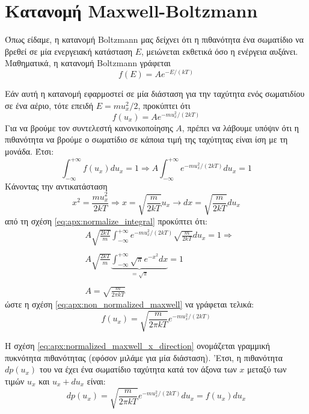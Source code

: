 \section{Κατανομή Maxwell-Boltzmann}
Όπως είδαμε, η κατανομή Boltzmann μας δείχνει ότι η πιθανότητα ένα σωματίδιο να βρεθεί σε μία ενεργειακή κατάσταση $E$, μειώνεται εκθετικά όσο η ενέργεια αυξάνει. Μαθηματικά, η κατανομή Boltzmann γράφεται
\begin{equation}
    f(E) = A e^{-E/(kT)}
\end{equation}

Εάν αυτή η κατανομή εφαρμοστεί σε μία διάσταση για την ταχύτητα ενός σωματιδίου σε ένα αέριο, τότε επειδή $E = mu_x^2/2$, προκύπτει ότι
\begin{equation}
    \label{eq:apx:non_normalized_maxwell}
    f(u_x) = A e^{-mu_x^2/(2kT)}
\end{equation}
Για να βρούμε τον συντελεστή κανονικοποίησης $A$, πρέπει να λάβουμε υπόψιν ότι η πιθανότητα να βρούμε ο σωματίδιο σε κάποια τιμή της ταχύτητας είναι ίση με τη μονάδα. Έτσι:
\begin{equation}
    \label{eq:apx:normalize_integral}
    \int_{- \infty}^{+ \infty} f(u_x) du_x = 1 \Rightarrow A \int_{- \infty}^{+ \infty} e^{-mu_x^2/(2kT)} du_x = 1
\end{equation}
Κάνοντας την αντικατάσταση 
$$x^2 = \frac{m u_x^2}{2kT} \Rightarrow x = \sqrt{\frac{m}{2kT}} u_x \longrightarrow dx = \sqrt{\frac{m}{2kT}} du_x$$
από τη σχέση \eqref{eq:apx:normalize_integral} προκύπτει ότι:
\begin{align}
    \label{eq:apx:normalization_coefficient}
    \nonumber & A \sqrt{\frac{2kT}{m}} \int_{- \infty}^{+ \infty} e^{-mu_x^2/(2kT)} \sqrt{\frac{m}{2kT}} du_x = 1 \Rightarrow  \\ \nonumber \\ \nonumber
    & A \sqrt{\frac{2kT}{m}} \underbrace{\int_{- \infty}^{+ \infty} \sqrt{\pi}{e^{-x^2} dx}}_{=\sqrt{\pi}} = 1 \\ \nonumber \\
    & A = \sqrt{\frac{m}{2\pi kT}}
\end{align}
ώστε η σχέση \eqref{eq:apx:non_normalized_maxwell} να γράφεται τελικά:
\begin{equation}
    \label{eq:apx:normalized_maxwell_x_direction}
    f(u_x) = \sqrt{\frac{m}{2\pi kT}} e^{-mu_x^2/(2kT)}
\end{equation}

Η σχέση \eqref{eq:apx:normalized_maxwell_x_direction} ονομάζεται γραμμική πυκνότητα πιθανότητας (εφόσον μιλάμε για μία διάσταση). 'Ετσι, η πιθανότητα $dp(u_x)$ του να έχει ένα σωματίδιο ταχύτητα κατά τον άξονα των $x$ μεταξύ των τιμών $u_x$ και $u_x+du_x$ είναι:
\begin{equation}
    \label{eq:apx:gauss_probability_x}
    dp(u_x) = \sqrt{\frac{m}{2\pi kT}} e^{-mu_x^2/(2kT)} du_x = f(u_x) du_x
\end{equation}

